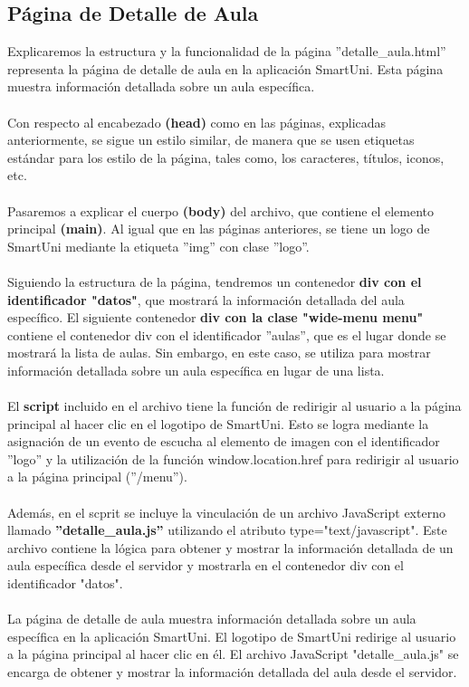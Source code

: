 \documentclass[12pt]{report}
\begin{document}
 \subsection{Página de Detalle de Aula}
Explicaremos la estructura y la funcionalidad de la página ''detalle\_aula.html'' representa la página de detalle de aula en la aplicación SmartUni. Esta página muestra información detallada sobre un aula específica.
\\\\
Con respecto al encabezado \textbf{(head)} como en las páginas, explicadas anteriormente, se sigue un estilo similar, de manera que se usen etiquetas estándar para los estilo de la página, tales como, los caracteres, títulos, iconos, etc.\\\\
Pasaremos a explicar el cuerpo \textbf{(body)} del archivo, que contiene el elemento principal \textbf{(main)}. Al igual que en las páginas anteriores, se tiene un logo de SmartUni mediante la etiqueta ''img'' con clase ''logo''.\\\\
Siguiendo la estructura de la página, tendremos un contenedor \textbf{div con el identificador "datos"}, que mostrará la información detallada del aula específico.
El siguiente contenedor \textbf{div con la clase "wide-menu menu"} contiene el contenedor div con el identificador ''aulas'', que es el lugar donde se mostrará la lista de aulas. Sin embargo, en este caso, se utiliza para mostrar información detallada sobre un aula específica en lugar de una lista.
\\\\ El \textbf{script}  incluido en el archivo tiene la función de redirigir al usuario a la página principal al hacer clic en el logotipo de SmartUni. Esto se logra mediante la asignación de un evento de escucha al elemento de imagen con el identificador ''logo'' y la utilización de la función window.location.href para redirigir al usuario a la página principal (''/menu'').
\\\\Además, en el scprit se incluye la vinculación de un archivo JavaScript externo llamado \textbf{''detalle\_aula.js''} utilizando el atributo type="text/javascript". Este archivo contiene la lógica para obtener y mostrar la información detallada de un aula específica desde el servidor y mostrarla en el contenedor div con el identificador "datos".
\\\\
La página de detalle de aula muestra información detallada sobre un aula específica en la aplicación SmartUni. El logotipo de SmartUni redirige al usuario a la página principal al hacer clic en él. El archivo JavaScript "detalle\_aula.js" se encarga de obtener y mostrar la información detallada del aula desde el servidor.
\end{document}
